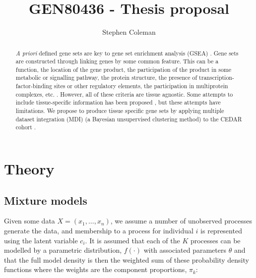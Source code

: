 \documentclass[11pt]{article} %
\title{GEN80436 - Thesis proposal}
\author{Stephen Coleman}
\providecommand{\keywords}[1]
{
	\small	
	\textbf{\textit{Keywords---}} #1
}
\begin{document}
 \pgfplotsset{compat=1.15}
	\maketitle
	
	\begin{abstract}
		\emph{A priori} defined gene sets are key to gene set enrichment analysis (GSEA) \cite{subramanian_gene_2005}. Gene sets are constructed through linking genes by some common feature. This can be a function, the location of the gene product, the participation of the product in some metabolic or signalling pathway, the protein structure, the presence of transcription-factor-binding sites or other regulatory elements, the participation in multiprotein complexes, etc. \cite{szklarczyk_string_2019}\cite{subramanian_gene_2005}\cite{kanehisa_new_2019} \cite{ashburner_gene_2000}. However, all of these criteria are tissue agnostic. Some attempts to include tissue-specific information has been proposed \cite{frost_computation_2018} \cite{greene_understanding_2015}, but these attempts have limitations. We propose to produce tissue specific gene sets by applying multiple dataset integration (MDI) \cite{kirk_bayesian_2012} (a Bayesian unsupervised clustering method) to the CEDAR cohort \cite{the_international_ibd_genetics_consortium_ibd_2018}.
	\end{abstract}


	
	\maketitle
	

	\section{Theory}
	\subsection{Mixture models} \label{mixture_models}
	Given some data $X = (x_1, \ldots, x_n)$, we assume a number of unobserved processes generate the data, and membership to a process for individual $i$ is represented using the latent variable $c_i$. It is assumed that each of the $K$ processes can be modelled by a parametric distribution, $f(\cdot)$ with associated parameters $\theta$ and that the full model density is then the weighted sum of these probability density functions where the weights are the component proportions, $\pi_k$:
	
\end{document}
